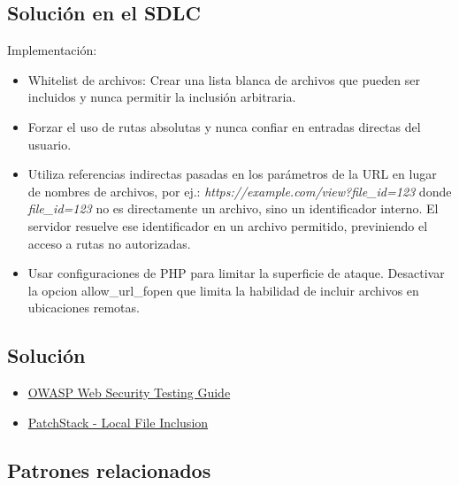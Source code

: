 \subsection*{Solución en el SDLC}

Implementación:

\begin{itemize}
    \item Whitelist de archivos: Crear una lista blanca de archivos que pueden ser incluidos y nunca permitir la inclusión arbitraria.
    \item Forzar el uso de rutas absolutas y nunca confiar en entradas directas del usuario.
    \item Utiliza referencias indirectas pasadas en los parámetros de la URL en lugar de nombres de archivos, por ej.: \textit{https://example.com/view?file\_id=123} donde \textit{file\_id=123} no es directamente un archivo, sino un identificador interno. El servidor resuelve ese identificador en un archivo permitido, previniendo el acceso a rutas no autorizadas.
    \item Usar configuraciones de PHP para limitar la superficie de ataque. Desactivar la opcion allow\_url\_fopen que limita la habilidad de incluir archivos en ubicaciones remotas.
\end{itemize}

\subsection*{Solución}

\begin{itemize}
    \item \href{https://owasp.org/www-project-web-security-testing-guide/v42/4-Web_Application_Security_Testing/07-Input_Validation_Testing/11.2-Testing_for_Remote_File_Inclusion}{OWASP Web Security Testing Guide}
    \item \href{https://patchstack.com/academy/wordpress/securing-code/local-file-inclusion/}{PatchStack - Local File Inclusion}
\end{itemize}

\subsection*{Patrones relacionados}

